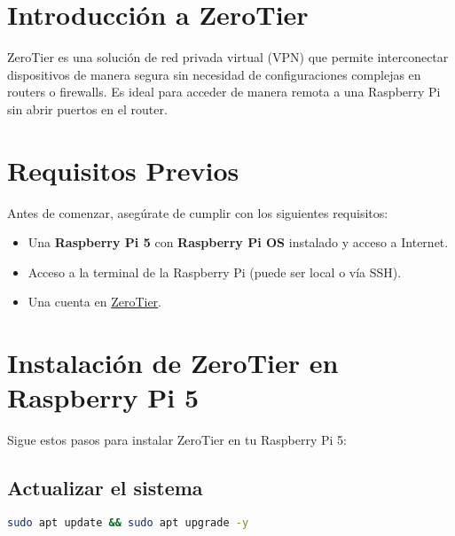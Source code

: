 

\section{Introducción a ZeroTier}
ZeroTier es una solución de red privada virtual (VPN) que permite interconectar dispositivos de manera segura sin necesidad de configuraciones complejas en routers o firewalls. Es ideal para acceder de manera remota a una Raspberry Pi sin abrir puertos en el router.


\section{Requisitos Previos}
Antes de comenzar, asegúrate de cumplir con los siguientes requisitos:
\begin{itemize}
    \item Una \textbf{Raspberry Pi 5} con \textbf{Raspberry Pi OS} instalado y acceso a Internet.
    \item Acceso a la terminal de la Raspberry Pi (puede ser local o vía SSH).
    \item Una cuenta en \href{https://my.zerotier.com}{ZeroTier}.
\end{itemize}


\section{Instalación de ZeroTier en Raspberry Pi 5}
Sigue estos pasos para instalar ZeroTier en tu Raspberry Pi 5:

\subsection{Actualizar el sistema}
\begin{lstlisting}[language=bash]
sudo apt update && sudo apt upgrade -y
\end{lstlisting}


